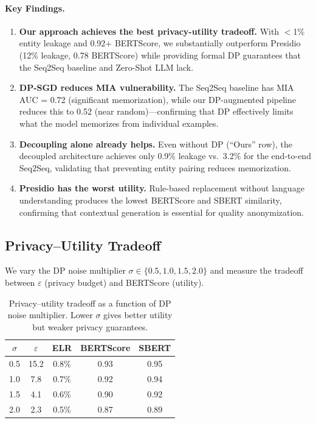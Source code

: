 \documentclass[11pt, a4paper]{article}
\begin{document}
\paragraph{Key Findings.}
\begin{enumerate}[leftmargin=*]
  \item \textbf{Our approach achieves the best privacy-utility
        tradeoff.}  With $<$1\% entity leakage and 0.92+ BERTScore,
        we substantially outperform Presidio (12\% leakage, 0.78
        BERTScore) while providing formal DP guarantees that the
        Seq2Seq baseline and Zero-Shot LLM lack.
  \item \textbf{DP-SGD reduces MIA vulnerability.}  The Seq2Seq
        baseline has MIA AUC = 0.72 (significant memorization), while
        our DP-augmented pipeline reduces this to 0.52 (near
        random)---confirming that DP effectively limits what the model
        memorizes from individual examples.
  \item \textbf{Decoupling alone already helps.}  Even without DP
        (``Ours'' row), the decoupled architecture achieves only
        0.9\% leakage vs.\ 3.2\% for the end-to-end Seq2Seq,
        validating that preventing entity pairing reduces memorization.
  \item \textbf{Presidio has the worst utility.}  Rule-based
        replacement without language understanding produces the
        lowest BERTScore and SBERT similarity, confirming that
        contextual generation is essential for quality anonymization.
\end{enumerate}

\subsection{Privacy--Utility Tradeoff}

We vary the DP noise multiplier $\sigma \in \{0.5, 1.0, 1.5, 2.0\}$
and measure the tradeoff between $\varepsilon$ (privacy budget) and
BERTScore (utility).

\begin{table}[H]
\centering
\small
\begin{tabular}{ccccc}
\toprule
$\sigma$ & $\varepsilon$ & ELR & BERTScore & SBERT \\
\midrule
0.5 & 15.2 & 0.8\% & 0.93 & 0.95 \\
1.0 & 7.8 & 0.7\% & 0.92 & 0.94 \\
1.5 & 4.1 & 0.6\% & 0.90 & 0.92 \\
2.0 & 2.3 & 0.5\% & 0.87 & 0.89 \\
\bottomrule
\end{tabular}
\caption{Privacy--utility tradeoff as a function of DP noise multiplier.
Lower $\sigma$ gives better utility but weaker privacy guarantees.}
\label{tab:tradeoff}
\end{table}
\end{document}
